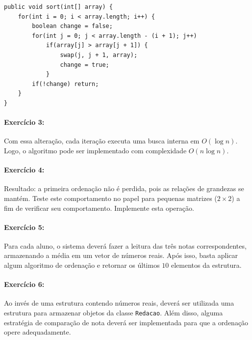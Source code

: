 \begin{lstlisting}[frame=single]
public void sort(int[] array) {
	for(int i = 0; i < array.length; i++) {
		boolean change = false;
		for(int j = 0; j < array.length - (i + 1); j++)
			if(array[j] > array[j + 1]) {
				swap(j, j + 1, array);
				change = true;
			}
		if(!change) return;
	}
}
\end{lstlisting}

\paragraph{Exercício 3:}
Com essa alteração, cada iteração executa uma busca interna em $O(\log n)$. Logo, o algoritmo pode ser implementado com complexidade $O(n \log n)$.

\paragraph{Exercício 4:}
Resultado: a primeira ordenação não é perdida, pois as relações de grandezas se mantém. Teste este comportamento no papel para pequenas matrizes ($2 \times 2$) a fim de verificar seu comportamento. Implemente esta operação.

\paragraph{Exercício 5:}
Para cada aluno, o sistema deverá fazer a leitura das três notas correspondentes, armazenando a média em um vetor de números reais. Após isso, basta aplicar algum algoritmo de ordenação e retornar os últimos $10$ elementos da estrutura.

\paragraph{Exercício 6:}
Ao invés de uma estrutura contendo números reais, deverá ser utilizada uma estrutura para armazenar objetos da classe \texttt{Redacao}. Além disso, alguma estratégia de comparação de nota deverá ser implementada para que a ordenação opere adequadamente.





